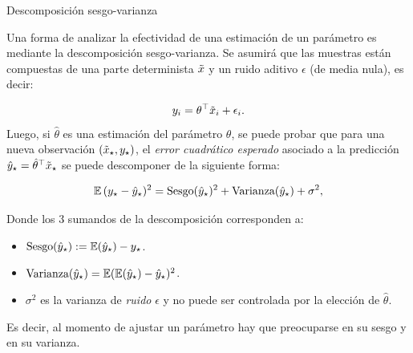 \documentclass[handout, 9pt]{beamer}
\begin{document}
\begin{frame}{Descomposición sesgo-varianza}

Una forma de analizar la efectividad de una estimación de un parámetro es mediante la descomposición sesgo-varianza. Se asumirá que las muestras están compuestas de una parte determinista $\tilde{x}$ y un ruido aditivo $\epsilon$ (de media nula), es decir:

\begin{equation*}
	y_i = \theta^\top\tilde{x}_i + \epsilon_i.
 \end{equation*}\pause
Luego, si $\hat\theta$ es una estimación del parámetro $\theta$, se puede probar que para una nueva observación $(\tilde{x}_\star,y_\star)$, el \emph{error cuadrático esperado} asociado a la predicción $\hat y_\star = \hat\theta^\top \tilde{x}_\star$ se puede descomponer de la siguiente forma:
 
\begin{equation*}
 	\operatorname{\mathbb{E}}{(y_\star - \hat y_\star)^2} = \text{Sesgo}(\hat y_\star)^2 + \text{Varianza}(\hat y_\star) + \sigma^2,\label{eq:expected_sq_loss}
 \end{equation*}

Donde los 3 sumandos de la descomposición corresponden a:\pause
 \begin{itemize}
 	\item $\text{Sesgo}(\hat y_\star) := \operatorname{\mathbb{E}}(\hat y_\star) - y_\star$.\pause
 	\item $\text{Varianza}(\hat y_\star) = \operatorname{\mathbb{E}}(\operatorname{\mathbb{E}}(\hat y_\star)- \hat y_\star)^2$.\pause
 	\item $\sigma^2$ es la varianza de \emph{ruido} $\epsilon$ y no puede ser controlada por la elección de $\hat\theta$.\pause
 \end{itemize}
 
 Es decir, al momento de ajustar un parámetro hay que preocuparse en su sesgo y en su varianza.

\end{frame}
\end{document}

